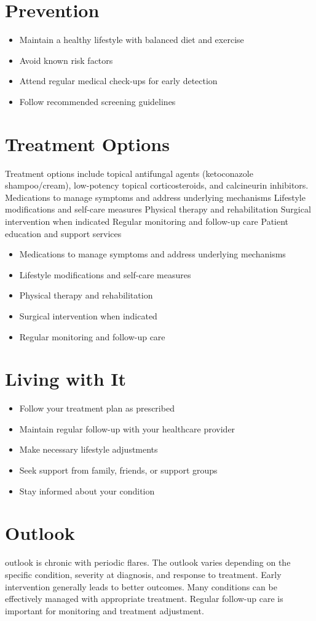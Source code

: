 \section{Prevention}
\begin{itemize}[noitemsep]
  \item Maintain a healthy lifestyle with balanced diet and exercise
  \item Avoid known risk factors
  \item Attend regular medical check-ups for early detection
  \item Follow recommended screening guidelines
\end{itemize}
\section{Treatment Options}
Treatment options include topical antifungal agents (ketoconazole shampoo/cream), low-potency topical corticosteroids, and calcineurin inhibitors. Medications to manage symptoms and address underlying mechanisms Lifestyle modifications and self-care measures Physical therapy and rehabilitation Surgical intervention when indicated Regular monitoring and follow-up care Patient education and support services

\begin{itemize}[noitemsep]
  \item Medications to manage symptoms and address underlying mechanisms
  \item Lifestyle modifications and self-care measures
  \item Physical therapy and rehabilitation
  \item Surgical intervention when indicated
  \item Regular monitoring and follow-up care
\end{itemize}
\section{Living with It}
\begin{itemize}[noitemsep]
  \item Follow your treatment plan as prescribed
  \item Maintain regular follow-up with your healthcare provider
  \item Make necessary lifestyle adjustments
  \item Seek support from family, friends, or support groups
  \item Stay informed about your condition
\end{itemize}
\section{Outlook}
outlook is chronic with periodic flares. The outlook varies depending on the specific condition, severity at diagnosis, and response to treatment. Early intervention generally leads to better outcomes. Many conditions can be effectively managed with appropriate treatment. Regular follow-up care is important for monitoring and treatment adjustment.
